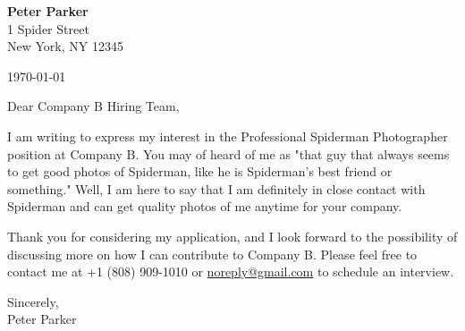 \documentclass[12pt,a4paper]{article}
\newcommand{\company}{Company B}
\newcommand{\position}{Professional Spiderman Photographer}
\begin{document}
\begin{flushleft}
\textbf{Peter Parker}\\
1 Spider Street\\
New York, NY 12345\\
\end{flushleft}
\begin{flushright}
\today
\end{flushright}

\begin{flushleft}
    Dear \company{} Hiring Team,
\end{flushleft}

\vspace{0.5em}

\begin{flushleft}

I am writing to express my interest in the \position{} position at \company. You may of heard of me as "that guy that always seems to get good photos of Spiderman, like he is Spiderman's best friend or something." Well, I am here to say that I am definitely in close contact with Spiderman and can get quality photos of me anytime for your company. 
\vspace{1em}

Thank you for considering my application, and I look forward to the possibility of discussing more on how I can contribute to \company. 
Please feel free to contact me at +1 (808) 909-1010 or 
\href{mailto://noreply@gmail.com}{noreply@gmail.com} to schedule an interview.
\end{flushleft}

\vspace{1em}
\begin{flushleft}
Sincerely, \\[3em]
Peter Parker
\end{flushleft}
\end{document}
